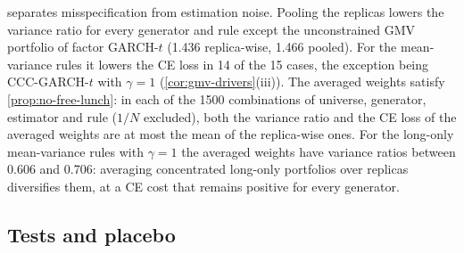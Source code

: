 \begin{table}[tbp]
  \centering
  \caption{Utility losses under three aggregations over the $B=20$ replicas (E4; sample moments;
  means over 30 universes). Replica: mean loss of the 20 portfolios built on single replicas (as
  in \cref{tab:e4-utility}); Pooled: one portfolio from the moments of the 20 stacked replicas;
  Avg.\ $w$: the mean of the 20 replica-wise weight vectors. Var.\ ratio: \TEST{} variance of the
  TSTR portfolio over the TRTR one; CE loss: TRTR minus TSTR certainty equivalent, percent per
  year. Point estimates.}
  \label{tab:e4-utility-agg}
  \small
\end{table}

 separates misspecification from estimation noise. Pooling the replicas
lowers the variance ratio for every generator and rule except the unconstrained GMV portfolio of
factor GARCH-$t$ (1.436 replica-wise, 1.466 pooled). For the mean-variance rules it lowers the CE
loss in 14 of the 15 cases, the exception being CCC-GARCH-$t$ with $\gamma=1$
(\cref{cor:gmv-drivers}(iii)). The averaged weights satisfy
\cref{prop:no-free-lunch}: in each of the 1500 combinations of universe, generator, estimator and
rule ($1/N$ excluded), both the variance ratio and the CE loss of the averaged weights are at
most the mean of the replica-wise ones. For the long-only mean-variance rules with $\gamma=1$ the
averaged weights have variance ratios between 0.606 and 0.706: averaging concentrated long-only
portfolios over replicas diversifies them, at a CE cost that remains positive for every generator.

\subsection{Tests and placebo}\label{app:mk-placebo}

\begin{table}[p]
  \centering
\end{table}

